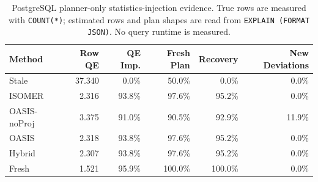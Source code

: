 \begin{table}[t]
  \centering
  \small
  \caption{PostgreSQL planner-only statistics-injection evidence. True rows are measured with \texttt{COUNT(*)}; estimated rows and plan shapes are read from \texttt{EXPLAIN (FORMAT JSON)}. No query runtime is measured.}
  \label{tab:postgres_planner_stats_injection}
  \setlength{\tabcolsep}{4pt}
  \begin{tabular}{lrrrrr}
    \toprule
    Method & Row QE & QE Imp. & Fresh Plan & Recovery & New Deviations \\
    \midrule
    Stale & 37.340 & 0.0\% & 50.0\% & 0.0\% & 0.0\% \\
    ISOMER & 2.316 & 93.8\% & 97.6\% & 95.2\% & 0.0\% \\
    OASIS-noProj & 3.375 & 91.0\% & 90.5\% & 92.9\% & 11.9\% \\
    OASIS & 2.318 & 93.8\% & 97.6\% & 95.2\% & 0.0\% \\
    Hybrid & 2.307 & 93.8\% & 97.6\% & 95.2\% & 0.0\% \\
    Fresh & 1.521 & 95.9\% & 100.0\% & 100.0\% & 0.0\% \\
    \bottomrule
  \end{tabular}
\end{table}
